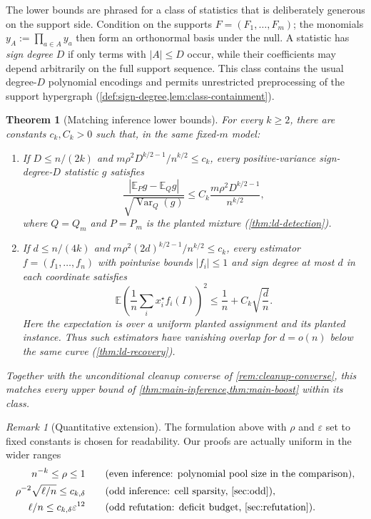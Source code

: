 \documentclass[11pt]{article}
\newtheorem{theorem}{Theorem}[section]
\theoremstyle{definition}
\theoremstyle{remark}
\newtheorem{remark}[remark]{Remark}
\newcommand{\E}{\mathbb E}
\newcommand{\1}{\mathbf 1}
\newcommand{\eps}{\varepsilon}
\DeclareMathOperator{\Var}{Var}
\numberwithin{equation}{section}
\begin{document}
The lower bounds are phrased for a class of statistics that is
deliberately generous on the support side.  Condition on the supports
$F=(F_1,\ldots,F_m)$; the monomials $y_A:=\prod_{a\in A}y_a$ then form
an orthonormal basis under the null.  A statistic has \emph{sign degree}
$D$ if only terms with $|A|\le D$ occur, while their coefficients may
depend arbitrarily on the full support sequence.  This class contains
the usual degree-$D$ polynomial encodings and permits unrestricted
preprocessing of the support hypergraph
(\cref{def:sign-degree,lem:class-containment}).

\begin{theorem}[Matching inference lower bounds]
\label{thm:main-lower}
For every $k\ge2$, there are constants $c_k,C_k>0$ such that, in the same
fixed-$m$ model:
\begin{enumerate}
\item If $D\le n/(2k)$ and
$m\rho^2D^{k/2-1}/n^{k/2}\le c_k$, every positive-variance sign-degree-$D$
statistic $g$ satisfies
\[
 \frac{|\E_Pg-\E_Qg|}{\sqrt{\Var_Q(g)}}
 \le C_k\frac{m\rho^2D^{k/2-1}}{n^{k/2}},
\]
where $Q=Q_m$ and $P=P_m$ is the planted mixture
(\cref{thm:ld-detection}).
\item If $d\le n/(4k)$ and
$m\rho^2(2d)^{k/2-1}/n^{k/2}\le c_k$, every estimator
$f=(f_1,\ldots,f_n)$ with pointwise bounds $|f_i|\le1$ and sign degree at
most $d$ in each coordinate satisfies
\[
 \E\left(\frac1n\sum_i x_i^\star f_i(I)\right)^2
 \le \frac1n+C_k\sqrt{\frac dn}.
\]
Here the expectation is over a uniform planted assignment and its planted
instance.  Thus such estimators have vanishing overlap for $d=o(n)$ below the
same curve (\cref{thm:ld-recovery}).
\end{enumerate}
Together with the unconditional cleanup converse of
\cref{rem:cleanup-converse}, this matches every upper bound of
\cref{thm:main-inference,thm:main-boost} within its class.
\end{theorem}

\begin{remark}[Quantitative extension]\label{rem:quantitative-ranges}
The formulation above with $\rho$ and $\eps$ set to  fixed constants is chosen for readability.  Our proofs
are actually uniform in the wider ranges
\begin{align}
 n^{-k}\le\rho\le1
 &\qquad\text{(even inference: polynomial pool size in the comparison)},
 \label{eq:even-floor}\\
 \rho^{-2}\sqrt{\ell/n}\le c_{k,\delta}
 &\qquad\text{(odd inference: cell sparsity, \cref{sec:odd})},
 \label{eq:modbias}\\
 \ell/n\le c_{k,\delta}\eps^{12}
 &\qquad\text{(odd refutation: deficit budget, \cref{sec:refutation})}.
 \label{eq:odd-ref-modbias}
\end{align}
\end{remark}
\end{document}
